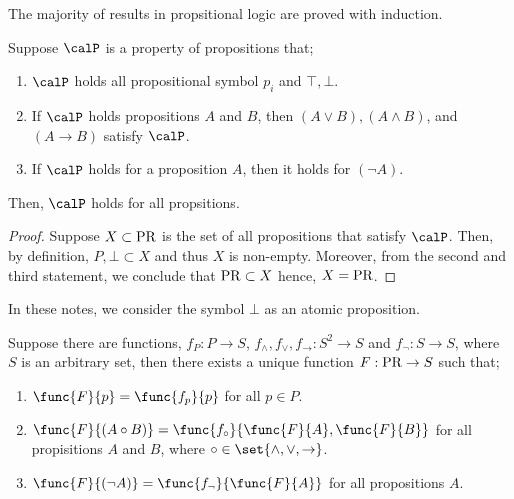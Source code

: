 The majority of results in propsitional logic are proved with induction.

\begin{theorem}
    Suppose \(\calP\) is a property of propositions that;
    \begin{enumerate}
        \item \(\calP\) holds all propositional symbol \(p_i\) and \(\top,\bot\).
        \item If \(\calP\) holds propositions \(A\) and \(B\), then \((A \lor B), (A \land B)\), and \((A \to B)\) satisfy \(\calP\).
        \item If \(\calP\) holds for a proposition \(A\), then it holds for \((\neg A)\).
    \end{enumerate}
    Then, \(\calP\) holds for all propsitions.
\end{theorem}

\begin{proof}
    Suppose \(X \subset \operatorname{PR}\) is the set of all propositions that satisfy \(\calP\). Then, by definition, \(P,\bot \subset X\) and thus \(X\) is non-empty. Moreover, from the second and third statement, we conclude that \(\operatorname{PR} \subset X\) hence, \(X = \operatorname{PR}\).
\end{proof}

In these notes, we consider the symbol \(\bot\) as an atomic proposition.

\begin{theorem} \label{thm:uniqueext}
    Suppose there are functions, \(f_P: P \to S\), \(f_{\land},f_{\lor}, f_{\to} : S^2 \to S\) and \(f_{\neg}: S \to S\), where \(S\) is an arbitrary set, then there exists a unique function \(F: \operatorname{PR} \to S\) such that;
    \begin{enumerate}
        \item \(\func{F}{p} = \func{f_p}{p}\) for all \(p \in P\).
        \item \(\func{F}{(A \circ B)} = \func{f_{\circ}}{\func{F}{A}, \func{F}{B}}\) for all propisitions \(A\) and \(B\), where \(\circ \in \set{\land,\lor,\to}\).
        \item \(\func{F}{(\neg A)} = \func{f_{\neg}}{\func{F}{A}}\) for all propositions \(A\).
    \end{enumerate}
\end{theorem}

